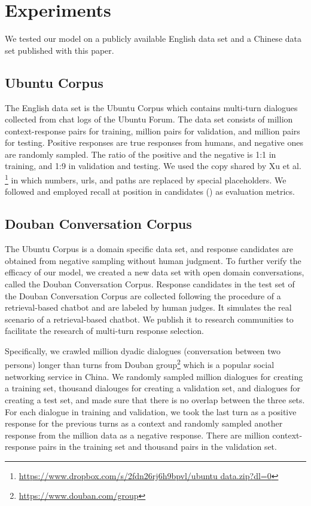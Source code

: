 \documentclass[11pt,a4paper]{article}
\begin{document}
	\section{Experiments}
	We tested our model on a publicly available English data set and a Chinese data set published with this paper.
	
	\subsection{Ubuntu Corpus}
	The English data set is the Ubuntu Corpus \cite{lowe2015ubuntu} which contains multi-turn dialogues collected from chat logs of the Ubuntu Forum. The data set consists of  million context-response pairs for training,  million pairs for validation, and  million pairs for testing. Positive responses are true responses from humans, and negative ones are randomly sampled. The ratio of the positive and the negative is 1:1 in training, and 1:9 in validation and testing. We used the copy shared by Xu et al.  \footnote{\url{https://www.dropbox.com/s/2fdn26rj6h9bpvl/ubuntu data.zip?dl=0}} 
	in which numbers, urls, and paths are replaced by special placeholders. We followed \cite{lowe2015ubuntu} and employed recall at position  in  candidates () as evaluation metrics.
	\subsection{Douban Conversation Corpus}
The Ubuntu Corpus is a domain specific data set, and response candidates are obtained from negative sampling without human judgment. To further verify the efficacy of our model, we created a new data set with open domain conversations, called the Douban Conversation Corpus. Response candidates in the test set of the Douban Conversation Corpus are collected following the procedure of a retrieval-based chatbot and are labeled by human judges. It simulates the real scenario of a retrieval-based chatbot. We publish it to research communities to facilitate the research of multi-turn response selection.
	
Specifically, we crawled  million dyadic dialogues (conversation between two persons) longer than  turns from Douban group\footnote{\url{https://www.douban.com/group}} which is a popular social networking service in China. We randomly sampled  million dialogues for creating a training set,  thousand dialouges for creating a validation set, and  dialogues for creating a test set, and made sure that there is no overlap between the three sets. For each dialogue in training and validation,  we took the last turn as a positive response for the previous turns as a context and randomly sampled another response from the  million data as a negative response. There are  million context-response pairs in the training set and  thousand pairs in the validation set. 
	
\end{document}
